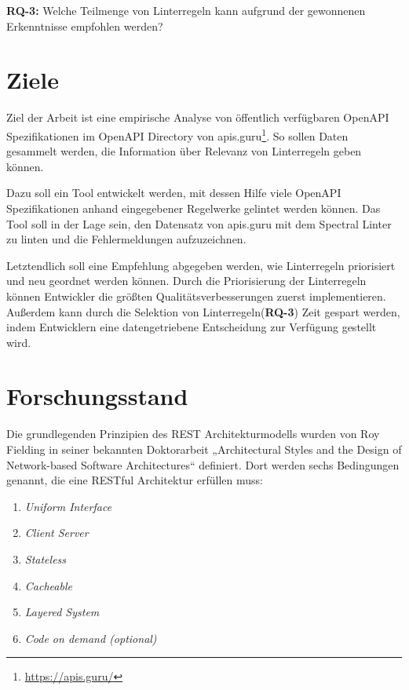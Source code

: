 \textbf{RQ-3:} Welche Teilmenge von Linterregeln kann aufgrund der gewonnenen Erkenntnisse empfohlen werden?


\section{Ziele}
Ziel der Arbeit ist eine empirische Analyse von öffentlich verfügbaren OpenAPI Spezifikationen im OpenAPI Directory von apis.guru\footnote{\href{https://apis.guru/}{https://apis.guru/}}. So sollen Daten gesammelt werden, die Information über Relevanz von Linterregeln geben können. 

Dazu soll ein Tool entwickelt werden, mit dessen Hilfe viele OpenAPI Spezifikationen anhand eingegebener Regelwerke gelintet werden können. Das Tool soll in der Lage sein, den Datensatz von apis.guru mit dem Spectral Linter zu linten und die Fehlermeldungen aufzuzeichnen.

Letztendlich soll eine Empfehlung abgegeben werden, wie Linterregeln priorisiert und neu geordnet werden können. Durch die Priorisierung der Linterregeln können Entwickler die größten Qualitätsverbesserungen zuerst implementieren. Außerdem kann durch die Selektion von Linterregeln(\textbf{RQ-3}) Zeit gespart werden, indem Entwicklern eine datengetriebene Entscheidung zur Verfügung gestellt wird.


    
\section{Forschungsstand}
Die grundlegenden Prinzipien des REST Architekturmodells wurden von Roy Fielding in seiner bekannten Doktorarbeit „Architectural Styles and the Design of Network-based Software Architectures“\parencite{fielding_architectural_2000} definiert. Dort werden sechs Bedingungen genannt, die eine RESTful Architektur erfüllen muss:

\begin{enumerate}
    \item \textit{Uniform Interface}
    \item \textit{Client Server}
    \item \textit{Stateless}
    \item \textit{Cacheable}
    \item \textit{Layered System}
    \item \textit{Code on demand (optional)}
\end{enumerate}

